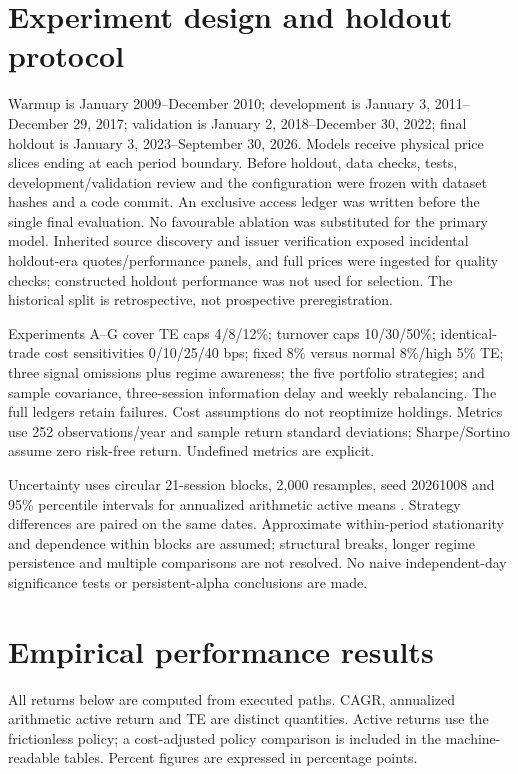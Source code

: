 \documentclass[11pt,a4paper]{article}
\begin{document}
\section{Experiment design and holdout protocol}
Warmup is January 2009--December 2010; development is January 3, 2011--December
29, 2017; validation is January 2, 2018--December 30, 2022; final holdout is
January 3, 2023--September 30, 2026. Models receive physical price slices
ending at each period boundary. Before holdout, data checks, tests,
development/validation review and the configuration were frozen with dataset
hashes and a code commit. An exclusive access ledger was written before
the single final evaluation. No favourable ablation was substituted for
the primary model. Inherited source discovery and issuer verification exposed
incidental holdout-era quotes/performance panels, and full prices were ingested
for quality checks; constructed holdout performance was not used for selection.
The historical split is retrospective, not prospective preregistration.

Experiments A--G cover TE caps 4/8/12\%; turnover caps 10/30/50\%; identical-trade
cost sensitivities 0/10/25/40 bps; fixed 8\% versus normal 8\%/high 5\% TE;
three signal omissions plus regime awareness; the five portfolio strategies;
and sample covariance, three-session information delay and weekly rebalancing.
The full ledgers retain failures. Cost assumptions do not reoptimize holdings.
Metrics use 252 observations/year and sample return standard deviations;
Sharpe/Sortino assume zero risk-free return. Undefined metrics are explicit.

Uncertainty uses circular 21-session blocks, 2,000 resamples, seed 20261008 and
95\% percentile intervals for annualized arithmetic active means \cite{pr}. Strategy
differences are paired on the same dates. Approximate within-period stationarity
and dependence within blocks are assumed; structural breaks, longer regime
persistence and multiple comparisons are not resolved. No naive independent-day
significance tests or persistent-alpha conclusions are made.
\section{Empirical performance results}
All returns below are computed from executed paths. CAGR, annualized arithmetic
active return and TE are distinct quantities. Active returns use the frictionless
policy; a cost-adjusted policy comparison is included in the machine-readable
tables. Percent figures are expressed in percentage points.
\end{document}
